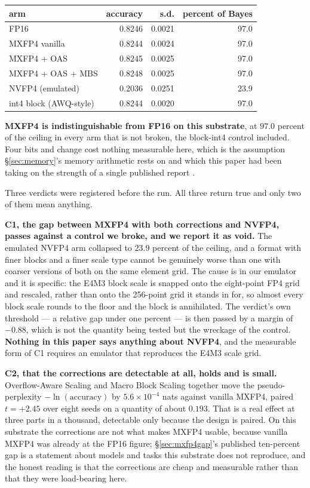 \documentclass[11pt]{article}
\begin{document}
\begin{center}
\begin{tabular}{@{}lrrr@{}}
\toprule
arm & accuracy & s.d. & percent of Bayes \\
\midrule
FP16 & 0.8246 & 0.0021 & 97.0 \\
MXFP4 vanilla & 0.8244 & 0.0024 & 97.0 \\
MXFP4 + OAS & 0.8245 & 0.0025 & 97.0 \\
MXFP4 + OAS + MBS & 0.8248 & 0.0025 & 97.0 \\
NVFP4 (emulated) & 0.2036 & 0.0251 & 23.9 \\
int4 block (AWQ-style) & 0.8244 & 0.0020 & 97.0 \\
\bottomrule
\end{tabular}
\end{center}

\textbf{MXFP4 is indistinguishable from FP16 on this substrate}, at $97.0$ percent of the ceiling in every arm that is not broken, the block-int4 control included. Four bits and change cost nothing measurable here, which is the assumption \S\ref{sec:memory}'s memory arithmetic rests on and which this paper had been taking on the strength of a single published report \cite{chhugani2026mxfp4}.

Three verdicts were registered before the run. All three return true and only two of them mean anything.

\textbf{C1, the gap between MXFP4 with both corrections and NVFP4, passes against a control we broke, and we report it as void.} The emulated NVFP4 arm collapsed to $23.9$ percent of the ceiling, and a format with finer blocks and a finer scale type cannot be genuinely worse than one with coarser versions of both on the same element grid. The cause is in our emulator and it is specific: the E4M3 block scale is snapped onto the eight-point FP4 grid and rescaled, rather than onto the 256-point grid it stands in for, so almost every block scale rounds to the floor and the block is annihilated. The verdict's own threshold --- a relative gap under one percent --- is then passed by a margin of $-0.88$, which is not the quantity being tested but the wreckage of the control. \textbf{Nothing in this paper says anything about NVFP4}, and the measurable form of C1 requires an emulator that reproduces the E4M3 scale grid.

\textbf{C2, that the corrections are detectable at all, holds and is small.} Overflow-Aware Scaling and Macro Block Scaling together move the pseudo-perplexity $-\ln(\text{accuracy})$ by $5.6\times10^{-4}$ nats against vanilla MXFP4, paired $t = +2.45$ over eight seeds on a quantity of about $0.193$. That is a real effect at three parts in a thousand, detectable only because the design is paired. On this substrate the corrections are not what makes MXFP4 usable, because vanilla MXFP4 was already at the FP16 figure; \S\ref{sec:mxfp4gap}'s published ten-percent gap is a statement about models and tasks this substrate does not reproduce, and the honest reading is that the corrections are cheap and measurable rather than that they were load-bearing here.
\end{document}

